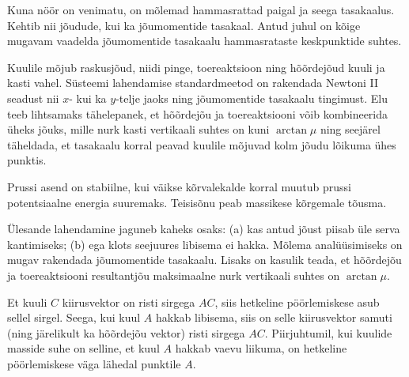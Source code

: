 \documentclass[10pt]{article}
\begin{document}
{%

\hint
Kuna nöör on venimatu, on mõlemad hammasrattad paigal ja seega tasakaalus. Kehtib nii jõudude, kui ka jõumomentide tasakaal. Antud juhul on kõige mugavam vaadelda jõumomentide tasakaalu hammasrataste keskpunktide suhtes.
\probend
\bigskip


\hint
Kuulile mõjub raskusjõud, niidi pinge, toereaktsioon ning hõõrdejõud kuuli ja kasti vahel. Süsteemi lahendamise standardmeetod on rakendada Newtoni II seadust nii $x$- kui ka $y$-telje jaoks ning jõumomentide tasakaalu tingimust. Elu teeb lihtsamaks tähelepanek, et hõõrdejõu ja toereaktsiooni võib kombineerida üheks jõuks, mille nurk kasti vertikaali suhtes on kuni $\arctan\mu$ ning seejärel täheldada, et tasakaalu korral peavad kuulile mõjuvad kolm jõudu lõikuma ühes punktis.
\probend
\bigskip


\hint
Prussi asend on stabiilne, kui väikse kõrvalekalde korral muutub prussi potentsiaalne energia suuremaks. Teisisõnu peab massikese kõrgemale tõusma.
\probend
\bigskip


\hint
Ülesande lahendamine jaguneb kaheks osaks: (a) kas antud jõust piisab üle serva kantimiseks; (b) ega klots seejuures libisema ei hakka. Mõlema analüüsimiseks on mugav rakendada jõumomentide tasakaalu. Lisaks on kasulik teada, et hõõrdejõu ja toereaktsiooni resultantjõu maksimaalne nurk vertikaali suhtes on $\arctan \mu$.
\probend
\bigskip


\hint
Et kuuli $C$ kiirusvektor on risti sirgega $AC$, siis hetkeline pöörlemiskese asub sellel sirgel. Seega, kui kuul $A$ hakkab libisema, siis on selle kiirusvektor samuti (ning järelikult ka hõõrdejõu vektor) risti sirgega $AC$. Piirjuhtumil, kui kuulide masside suhe on selline, et kuul $A$ hakkab vaevu liikuma, on hetkeline pöörlemiskese väga lähedal punktile $A$.
\probend
\bigskip

}
\end{document}
